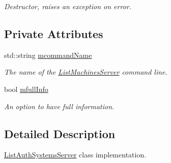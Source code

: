 \begin{DoxyCompactItemize}
\begin{DoxyCompactList}\small\item\em Destructor, raises an exception on error. \item\end{DoxyCompactList}\end{DoxyCompactItemize}
\subsection*{Private Attributes}
\begin{DoxyCompactItemize}
\item 
\hypertarget{classListAuthSystemsServer_a40fd0b75e55239a6a96b67fb9c14f477}{
std::string \hyperlink{classListAuthSystemsServer_a40fd0b75e55239a6a96b67fb9c14f477}{mcommandName}}
\label{classListAuthSystemsServer_a40fd0b75e55239a6a96b67fb9c14f477}

\begin{DoxyCompactList}\small\item\em The name of the \hyperlink{classListMachinesServer}{ListMachinesServer} command line. \item\end{DoxyCompactList}\item 
\hypertarget{classListAuthSystemsServer_aec94336e2c620c14cfbeee61de73317b}{
bool \hyperlink{classListAuthSystemsServer_aec94336e2c620c14cfbeee61de73317b}{mfullInfo}}
\label{classListAuthSystemsServer_aec94336e2c620c14cfbeee61de73317b}

\begin{DoxyCompactList}\small\item\em An option to have full information. \item\end{DoxyCompactList}\end{DoxyCompactItemize}


\subsection{Detailed Description}
\hyperlink{classListAuthSystemsServer}{ListAuthSystemsServer} class implementation. 

